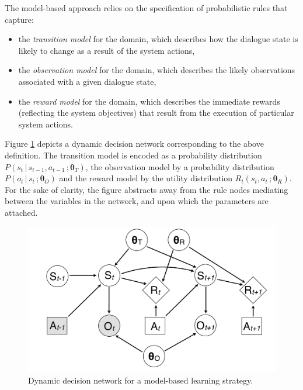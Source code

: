 The model-based approach relies on the specification of probabilistic rules that capture:
\begin{itemize}
\item the \textit{transition model} for the domain, which describes how the dialogue state is likely to change as a result of the system actions,
\item the \textit{observation model} for the domain, which describes the likely observations associated with a given dialogue state,
\item the \textit{reward model} for the domain, which describes the immediate rewards (reflecting the system objectives) that result from the execution of particular system actions.
\end{itemize}

Figure \ref{fig:modelbasediagram} depicts a dynamic decision network corresponding to the above definition. The transition model is encoded as a probability distribution $P(s_t \, | \, s_{t-1}, a_{t-1} \,; \boldsymbol\theta_T)$, the observation model by a probability distribution $P(o_t \, | \, s_t\,; \boldsymbol\theta_O)$ and the reward model by the utility distribution $R_t(s_t,a_t\,; \boldsymbol\theta_R)$. For the sake of clarity, the figure abstracts away from the rule nodes mediating between the variables in the network, and upon which the parameters are attached.

\begin{figure}[ht]
\centering
\includegraphics[scale=0.25]{imgs/modelbaseddiagram.pdf}
\caption{Dynamic decision network for a model-based learning strategy.}
\label{fig:modelbasediagram}
\end{figure}

